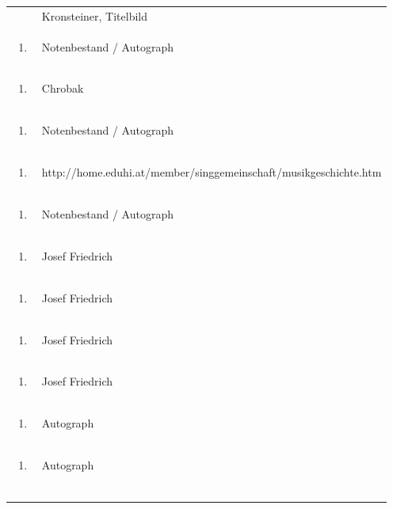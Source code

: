 \documentclass[a4paper]{article}
\begin{document}
\begin{flushleft}
\begin{supertabular}{m{1.2409999cm}m{14.604cm}}
 &
Kronsteiner, Titelbild\\
\begin{enumerate}
\item
\end{enumerate}
 &
Notenbestand / Autograph\\
\begin{enumerate}
\item
\end{enumerate}
 &
Chrobak\\
\begin{enumerate}
\item
\end{enumerate}
 &
Notenbestand / Autograph\\
\begin{enumerate}
\item
\end{enumerate}
 &
http://home.eduhi.at/member/singgemeinschaft/musikgeschichte.htm\\
\begin{enumerate}
\item
\end{enumerate}
 &
Notenbestand / Autograph\\
\begin{enumerate}
\item
\end{enumerate}
 &
Josef Friedrich\\
\begin{enumerate}
\item
\end{enumerate}
 &
Josef Friedrich\\
\begin{enumerate}
\item
\end{enumerate}
 &
Josef Friedrich\\
\begin{enumerate}
\item
\end{enumerate}
 &
Josef Friedrich\\
\begin{enumerate}
\item
\end{enumerate}
 &
Autograph\\
\begin{enumerate}
\item
\end{enumerate}
 &
Autograph\\
\begin{enumerate}

\end{enumerate}
\end{supertabular}
\end{flushleft}
\end{document}

